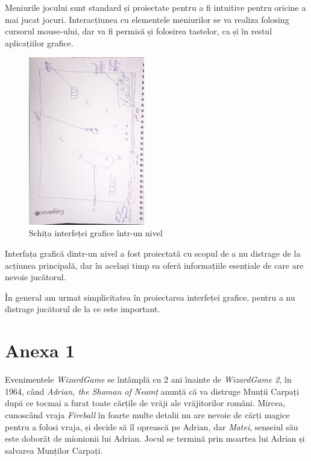 \documentclass{article}
\begin{document}
    Meniurile jocului sunt standard și proiectate pentru a fi intuitive pentru oricine a mai jucat
    jocuri. Interacțiunea cu elementele meniurilor se va realiza folosing cursorul mouse-ului, dar
    va fi permisă și folosirea tastelor, ca și în restul aplicațiilor grafice.

    \begin{figure}[H]
        \includegraphics[width=0.45\textwidth, angle=90]{designing-level-ui}
        \centering
        \caption{Schița interfeței grafice într-un nivel}
    \end{figure}

    Interfața grafică dintr-un nivel a fost proiectată cu scopul de a nu distrage de
    la acțiunea principală, dar în același timp ea oferă informațiile esențiale de care are
    nevoie jucătorul.

    În general am urmat simplicitatea în proiectarea interfeței grafice, pentru a nu distrage
    jucătorul de la ce este important.

    \FloatBarrier
    \section*{Anexa 1}
    \label{sec:anexa1}
    Evenimentele \emph{WizardGame} se întâmplă cu 2 ani înainte de \emph{WizardGame 2}, în 1964,
    când \emph{Adrian, the Shaman of Neamț} anunță că va distruge Munții Carpați după ce tocmai
    a furat toate cărțile de vrăji ale vrăjitorilor români. Mircea, cunoscând vraja \emph{Fireball}
    în foarte multe detalii nu are nevoie de cărți magice pentru a folosi vraja, și decide să îl
    oprească pe Adrian, dar \emph{Matei}, senseiul său este doborât de mionionii lui Adrian.
    Jocul se termină prin moartea lui Adrian și salvarea Munților Carpați.
\end{document}
